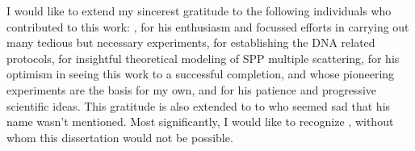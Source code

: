 I would like to extend my sincerest gratitude to the following individuals
who contributed to this work: , for his enthusiasm and
focussed efforts in carrying out many tedious but necessary experiments,
 for establishing the DNA related protocols,
 for insightful theoretical modeling of SPP multiple
scattering,  for his optimism in seeing this work to a
successful completion,  and 
whose pioneering experiments are the basis for my own, and 
for his patience and progressive scientific ideas. This gratitude is also
extended to to  who seemed sad that his name wasn't
mentioned.  Most significantly, I would like to recognize
, without whom this dissertation would not be
possible.
